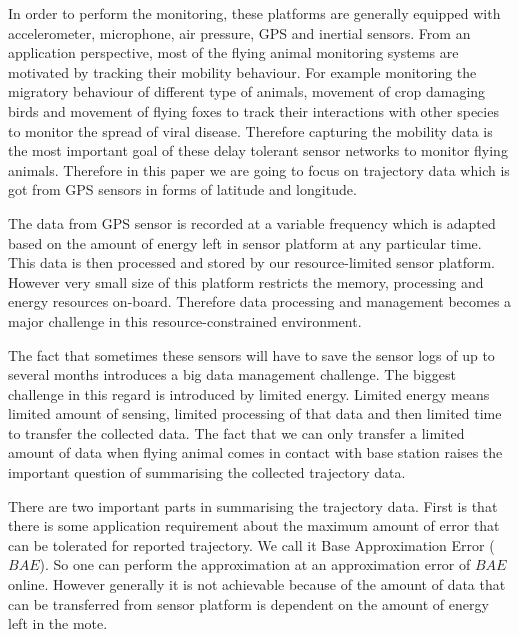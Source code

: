\documentclass[conference]{IEEEtran}
\begin{document}
In order to perform the monitoring, these platforms are generally equipped with accelerometer, microphone, air pressure, GPS and inertial sensors. From an application perspective, most of the flying animal monitoring systems are motivated by tracking their mobility behaviour. For example monitoring the migratory behaviour of different type of animals, movement of crop damaging birds and movement of flying foxes to track their interactions with other species to monitor the spread of viral disease\cite{raja-ipsn}. Therefore capturing the mobility data is the most important goal of these delay tolerant sensor networks to monitor flying animals. Therefore in this paper we are going to focus on trajectory data which is got from GPS sensors in forms of latitude and longitude.

The data from GPS sensor is recorded at a variable frequency which is adapted based on the amount of energy left in sensor platform at any particular time. This data is then processed and stored by our resource-limited sensor platform. However very small size of this platform restricts the memory, processing and energy resources on-board. Therefore data processing and management becomes a major challenge in this resource-constrained environment. 

The fact that sometimes these sensors will have to save the sensor logs of up to several months introduces a big data management challenge. The biggest challenge in this regard is introduced by limited energy. Limited energy means limited amount of sensing, limited processing of that data and then limited time to transfer the collected data. The fact that we can only transfer a limited amount of data when flying animal comes in contact with base station raises the important question of summarising the collected trajectory data. 

There are two important parts in summarising the trajectory data. First is that there is some application requirement about the maximum amount of error that can be tolerated for reported trajectory. We call it Base Approximation Error ($BAE$). So one can perform the approximation at an approximation error of $BAE$ online. However generally it is not achievable because of the amount of data that can be transferred from sensor platform is dependent on the amount of energy left in the mote.
\end{document}
